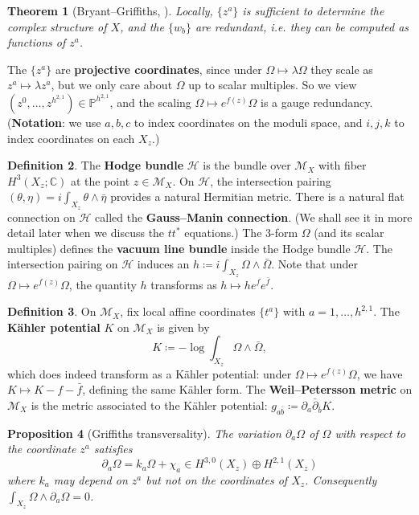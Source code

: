 \documentclass{report}
\theoremstyle{plain}
\newtheorem{theorem}{Theorem}[section]
\newtheorem{proposition}[theorem]{Proposition}
\theoremstyle{definition}
\newtheorem{definition}[theorem]{Definition}
\theoremstyle{remark}
\newcommand{\di}{\partial}
\newcommand{\bC}{\mathbb{C}}
\newcommand{\bP}{\mathbb{P}}
\newcommand{\cH}{\mathcal{H}}
\newcommand{\cM}{\mathcal{M}}
\newcommand{\bdi}{\bar{\di}}
\begin{document}
\begin{theorem}[Bryant--Griffiths, \cite{Bryant1983}]
  Locally, $\{z^a\}$ is sufficient to determine the complex structure
  of $X$, and the $\{w_b\}$ are redundant, i.e. they can be computed
  as functions of $z^a$.
\end{theorem}

The $\{z^a\}$ are {\bf projective coordinates}, since under $\Omega
\mapsto \lambda \Omega$ they scale as $z^a \mapsto \lambda z^a$, but
we only care about $\Omega$ up to scalar multiples. So we view $(z^0,
\ldots, z^{h^{2,1}}) \in \bP^{h^{2,1}}$, and the scaling $\Omega
\mapsto e^{f(z)}\Omega$ is a gauge redundancy. ({\bf Notation}: we use
$a, b, c$ to index coordinates on the moduli space, and $i, j, k$ to
index coordinates on each $X_z$.)

\begin{definition}
  The {\bf Hodge bundle} $\cH$ is the bundle over $\cM_X$ with fiber
  $H^3(X_z; \bC)$ at the point $z \in \cM_X$. On $\cH$, the
  intersection pairing $(\theta, \eta) = i\int_{X_z} \theta \wedge
  \bar{\eta}$ provides a natural Hermitian metric. There is a natural
  flat connection on $\cH$ called the {\bf Gauss--Manin connection}.
  (We shall see it in more detail later when we discuss the $tt^*$
  equations.) The $3$-form $\Omega$ (and its scalar multiples) defines
  the {\bf vacuum line bundle} inside the Hodge bundle $\cH$. The
  intersection pairing on $\cH$ induces an $h \coloneqq i\int_{X_z}
  \Omega \wedge \bar{\Omega}$. Note that under $\Omega \mapsto
  e^{f(z)} \Omega$, the quantity $h$ transforms as $h \mapsto h e^f
  e^{\bar{f}}$.
\end{definition}

\begin{definition}
  On $\cM_X$, fix local affine coordinates $\{t^a\}$ with $a=1,
  \ldots, h^{2,1}$. The {\bf K\"ahler potential} $K$ on $\cM_X$ is
  given by
  \[ K \coloneqq -\log \int_{X_z} \Omega \wedge \bar{\Omega}, \]
  which does indeed transform as a K\"ahler potential: under $\Omega
  \mapsto e^{f(z)} \Omega$, we have $K \mapsto K - f - \bar{f}$,
  defining the same K\"ahler form. The {\bf Weil--Petersson metric} on
  $\cM_X$ is the metric associated to the K\"ahler potential:
  $g_{a\bar{b}} \coloneqq \di_a \bdi_{\bar{b}} K$.
\end{definition}

\begin{proposition}[Griffiths transversality] \label{thm:griffiths-transversality}
  The variation $\di_a\Omega$ of $\Omega$ with respect to the
  coordinate $z^a$ satisfies
  \[ \di_a\Omega = k_a \Omega + \chi_a \in H^{3,0}(X_z) \oplus H^{2,1}(X_z) \]
  where $k_a$ may depend on $z^a$ but not on the coordinates
  of $X_z$. Consequently $\int_{X_z} \Omega \wedge \di_a\Omega = 0$.
\end{proposition}
\end{document}
